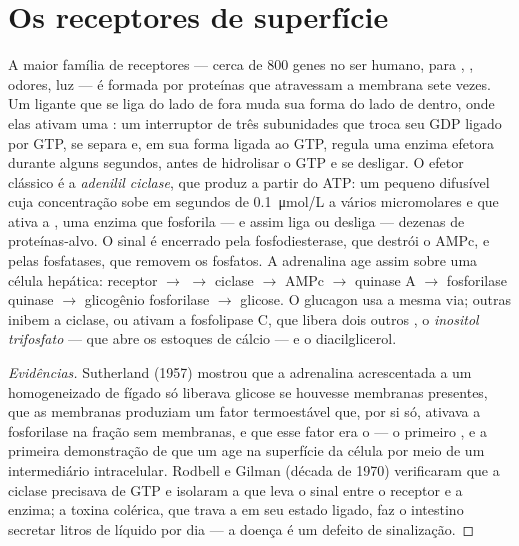 \section{Os receptores de superfície}

\begin{proposition}\label{prop:b2:cell-signalling:gpcr}
A maior família de receptores --- cerca de \num{800} genes no ser
humano, para , , odores, luz --- é formada
por proteínas que atravessam a membrana sete vezes. Um ligante que se
liga do lado de fora muda sua forma do lado de dentro, onde elas ativam
uma \emph{}: um interruptor de três subunidades que troca seu
GDP ligado por GTP, se separa e, em sua forma ligada ao GTP, regula uma
enzima efetora durante alguns segundos, antes de hidrolisar o GTP e se
desligar. O efetor clássico é a \emph{adenilil ciclase}, que produz
\emph{} a partir do ATP: um pequeno \emph{} difusível cuja concentração sobe em segundos de
\qty{0.1}{\micro mol/L} a vários micromolares e que ativa a
\emph{}, uma enzima que fosforila --- e assim liga ou
desliga --- dezenas de proteínas-alvo. O sinal é encerrado pela
fosfodiesterase, que destrói o AMPc, e pelas fosfatases, que removem os
fosfatos. A adrenalina age assim sobre uma célula hepática: receptor
$\to$  $\to$ ciclase $\to$ AMPc $\to$ quinase A $\to$
fosforilase quinase $\to$ glicogênio fosforilase $\to$ glicose. O
glucagon usa a mesma via; outras  inibem a ciclase, ou
ativam a fosfolipase C, que libera dois outros , o
\emph{inositol trifosfato} --- que abre os estoques de cálcio --- e o
diacilglicerol.
\end{proposition}
\begin{proof}[Evidências]
Sutherland (1957) mostrou que a adrenalina acrescentada a um
homogeneizado de fígado só liberava glicose se houvesse membranas
presentes, que as membranas produziam um fator termoestável que, por si
só, ativava a fosforilase na fração sem membranas, e que esse fator era
o  --- o primeiro , e a primeira
demonstração de que um  age na superfície da célula por meio de
um intermediário intracelular. Rodbell e Gilman (década de 1970)
verificaram que a ciclase precisava de GTP e isolaram a  que
leva o sinal entre o receptor e a enzima; a toxina colérica, que trava a
 em seu estado ligado, faz o intestino secretar litros de
líquido por dia --- a doença é um defeito de sinalização.
\end{proof}

